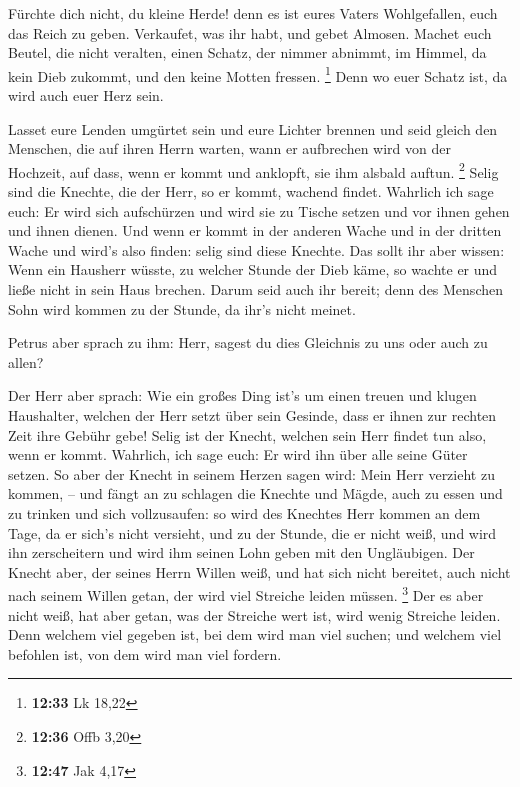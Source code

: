  Fürchte dich nicht, du kleine Herde! denn es ist eures
Vaters Wohlgefallen, euch das Reich zu geben.  Verkaufet,
was ihr habt, und gebet Almosen. Machet euch Beutel, die nicht veralten,
einen Schatz, der nimmer abnimmt, im Himmel, da kein Dieb zukommt, und
den keine Motten fressen. \footnote{\textbf{12:33} Lk 18,22}
 Denn wo euer Schatz ist, da wird auch euer Herz sein.

 Lasset eure Lenden umgürtet sein und eure Lichter brennen
 und seid gleich den Menschen, die auf ihren Herrn warten,
wann er aufbrechen wird von der Hochzeit, auf dass, wenn er kommt und
anklopft, sie ihm alsbald auftun. \footnote{\textbf{12:36} Offb 3,20}
 Selig sind die Knechte, die der Herr, so er kommt, wachend
findet. Wahrlich ich sage euch: Er wird sich aufschürzen und wird sie zu
Tische setzen und vor ihnen gehen und ihnen dienen.  Und
wenn er kommt in der anderen Wache und in der dritten Wache und wird's
also finden: selig sind diese Knechte.  Das sollt ihr aber
wissen: Wenn ein Hausherr wüsste, zu welcher Stunde der Dieb käme, so
wachte er und ließe nicht in sein Haus brechen.  Darum seid
auch ihr bereit; denn des Menschen Sohn wird kommen zu der Stunde, da
ihr's nicht meinet.

 Petrus aber sprach zu ihm: Herr, sagest du dies Gleichnis
zu uns oder auch zu allen?

 Der Herr aber sprach: Wie ein großes Ding ist's um einen
treuen und klugen Haushalter, welchen der Herr setzt über sein Gesinde,
dass er ihnen zur rechten Zeit ihre Gebühr gebe!  Selig ist
der Knecht, welchen sein Herr findet tun also, wenn er kommt.
 Wahrlich, ich sage euch: Er wird ihn über alle seine Güter
setzen.  So aber der Knecht in seinem Herzen sagen wird:
Mein Herr verzieht zu kommen, -- und fängt an zu schlagen die Knechte
und Mägde, auch zu essen und zu trinken und sich vollzusaufen:
 so wird des Knechtes Herr kommen an dem Tage, da er sich's
nicht versieht, und zu der Stunde, die er nicht weiß, und wird ihn
zerscheitern und wird ihm seinen Lohn geben mit den Ungläubigen.
 Der Knecht aber, der seines Herrn Willen weiß, und hat
sich nicht bereitet, auch nicht nach seinem Willen getan, der wird viel
Streiche leiden müssen. \footnote{\textbf{12:47} Jak 4,17} 
Der es aber nicht weiß, hat aber getan, was der Streiche wert ist, wird
wenig Streiche leiden. Denn welchem viel gegeben ist, bei dem wird man
viel suchen; und welchem viel befohlen ist, von dem wird man viel
fordern.

